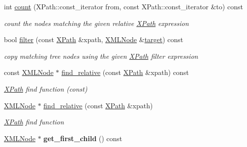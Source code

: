 \begin{DoxyCompactItemize}
\mbox{\label{struct_x_m_l_storage_1_1_x_m_l_node_a495cf46aa1549151209121528a3f5f99}} 
int \hyperlink{struct_x_m_l_storage_1_1_x_m_l_node_a495cf46aa1549151209121528a3f5f99}{count} (X\+Path\+::const\+\_\+iterator from, const X\+Path\+::const\+\_\+iterator \&to) const
\begin{DoxyCompactList}\small\item\em count the nodes matching the given relative \hyperlink{struct_x_m_l_storage_1_1_x_path}{X\+Path} expression \end{DoxyCompactList}\item 
\mbox{\label{struct_x_m_l_storage_1_1_x_m_l_node_a687d5513ec09097f427655f81b4c18b0}} 
bool \hyperlink{struct_x_m_l_storage_1_1_x_m_l_node_a687d5513ec09097f427655f81b4c18b0}{filter} (const \hyperlink{struct_x_m_l_storage_1_1_x_path}{X\+Path} \&xpath, \hyperlink{struct_x_m_l_storage_1_1_x_m_l_node}{X\+M\+L\+Node} \&\hyperlink{interfacevoid}{target}) const
\begin{DoxyCompactList}\small\item\em copy matching tree nodes using the given \hyperlink{struct_x_m_l_storage_1_1_x_path}{X\+Path} filter expression \end{DoxyCompactList}\item 
\mbox{\label{struct_x_m_l_storage_1_1_x_m_l_node_a11f06d505b8da3b6bb5e95e8f4254252}} 
const \hyperlink{struct_x_m_l_storage_1_1_x_m_l_node}{X\+M\+L\+Node} $\ast$ \hyperlink{struct_x_m_l_storage_1_1_x_m_l_node_a11f06d505b8da3b6bb5e95e8f4254252}{find\+\_\+relative} (const \hyperlink{struct_x_m_l_storage_1_1_x_path}{X\+Path} \&xpath) const
\begin{DoxyCompactList}\small\item\em \hyperlink{struct_x_m_l_storage_1_1_x_path}{X\+Path} find function (const) \end{DoxyCompactList}\item 
\mbox{\label{struct_x_m_l_storage_1_1_x_m_l_node_a769b23a9242db1a9d0d093dde551c3d2}} 
\hyperlink{struct_x_m_l_storage_1_1_x_m_l_node}{X\+M\+L\+Node} $\ast$ \hyperlink{struct_x_m_l_storage_1_1_x_m_l_node_a769b23a9242db1a9d0d093dde551c3d2}{find\+\_\+relative} (const \hyperlink{struct_x_m_l_storage_1_1_x_path}{X\+Path} \&xpath)
\begin{DoxyCompactList}\small\item\em \hyperlink{struct_x_m_l_storage_1_1_x_path}{X\+Path} find function \end{DoxyCompactList}\item 
\mbox{\label{struct_x_m_l_storage_1_1_x_m_l_node_a0097079f574ec95ec9ac39b6ef04c490}} 
\hyperlink{struct_x_m_l_storage_1_1_x_m_l_node}{X\+M\+L\+Node} $\ast$ {\bfseries get\+\_\+first\+\_\+child} () const
\end{DoxyCompactItemize}
